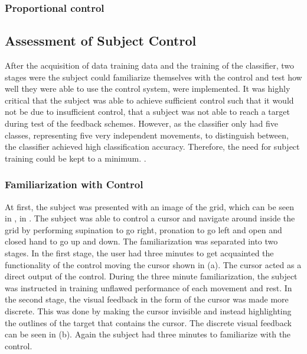 \subsubsection{Proportional control}  




\subsection{Assessment of Subject Control}

After the acquisition of data training data and the training of the classifier, two stages were the subject could familiarize themselves with the control and test how well they were able to use the control system, were implemented. It was highly critical that the subject was able to achieve sufficient control such that it would not be due to insufficient control, that a subject was not able to reach a target during test of the feedback schemes. However, as the classifier only had five classes, representing five very independent movements, to distinguish between, the classifier achieved high classification accuracy. Therefore, the need for subject training could be kept to a minimum. .  

\subsubsection{Familiarization with Control}

At first, the subject was presented with an image of the grid, which can be seen in , in . The subject was able to control a cursor and navigate around inside the grid by performing supination to go right, pronation to go left and open and closed hand to go up and down. The familiarization was separated into two stages. In the first stage, the user had three minutes to get acquainted the functionality of the control moving the cursor shown in  (a). The cursor acted as a direct output of the control. During the three minute familiarization, the subject was instructed in training unflawed performance of each movement and rest. In the second stage, the visual feedback in the form of the cursor was made more discrete. This was done by making the cursor invisible and instead highlighting the outlines of the target that contains the cursor. The discrete visual feedback can be seen in  (b). Again the subject had three minutes to familiarize with the control. 

